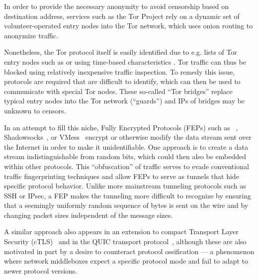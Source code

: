 In order to provide the necessary anonymity to avoid censorship based on destination address, services such as the Tor Project \cite{torproject} rely on a dynamic set of volunteer-operated entry nodes into the Tor network, which uses onion routing to anonymize traffic.

Nonetheless, the Tor protocol itself is easily identified due to e.g. lists of Tor entry nodes such as \cite{danNodeList} or using time-based characteristics \cite{icissp17}. Tor traffic can thus be blocked using relatively inexpensive traffic inspection. To remedy this issue, protocols are required that are difficult to identify, which can then be used to communicate with special Tor nodes. These so-called ``Tor bridges'' replace typical entry nodes into the Tor network (``guards'') and IPs of bridges may be unknown to censors.

In an attempt to fill this niche, Fully Encrypted Protocols (FEPs) such as \obfsfour{}~\cite{obfs4}, \textsf{Shadowsocks}~\cite{shadowsocks}, or \textsf{VMess}~\cite{vmess} encrypt or otherwise modify the data stream sent over the Internet in order to make it unidentifiable. One approach is to create a data stream indistinguishable from random bits, which could then also be embedded within other protocols. This ``obfuscation'' of traffic serves to evade conventional traffic fingerprinting techniques and allow FEPs to serve as tunnels that hide specific protocol behavior.
Unlike more mainstream tunneling protocols such as SSH or IPsec, a FEP makes the tunneling more difficult to recognize by ensuring that a seemingly uniformly random sequence of bytes is sent on the wire and by changing packet sizes independent of the message sizes.

A similar approach also appears in an extension to compact Transport Layer Security (cTLS)~\cite{cpbs-pseudorandom-ctls-01} and in the QUIC transport protocol~\cite{rfc9000}, although these are also motivated in part by a desire to counteract protocol ossification --- a phenomenon where network middleboxes expect a specific protocol mode and fail to adapt to newer protocol versions.

